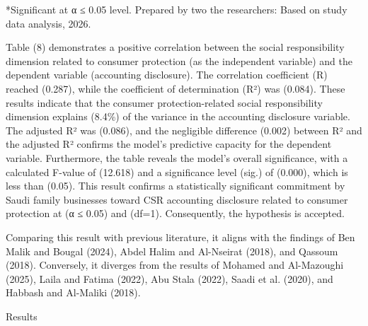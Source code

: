 \documentclass[10pt]{NSP1}
\begin{document}
*Significant at α ≤ 0.05 level. Prepared by two the researchers: Based on study data analysis, 2026.

Table (8) demonstrates a positive correlation between the social responsibility dimension related to consumer protection (as the independent variable) and the dependent variable (accounting disclosure). The correlation coefficient (R) reached (0.287), while the coefficient of determination (R²) was (0.084). These results indicate that the consumer protection-related social responsibility dimension explains (8.4\%) of the variance in the accounting disclosure variable. The adjusted R² was (0.086), and the negligible difference (0.002) between R² and the adjusted R² confirms the model’s predictive capacity for the dependent variable. Furthermore, the table reveals the model's overall significance, with a calculated F-value of (12.618) and a significance level (sig.) of (0.000), which is less than (0.05). This result confirms a statistically significant commitment by Saudi family businesses toward CSR accounting disclosure related to consumer protection at (α ≤ 0.05) and (df=1). Consequently, the hypothesis is accepted.

Comparing this result with previous literature, it aligns with the findings of Ben Malik and Bougal (2024), Abdel Halim and Al-Nseirat (2018), and Qassoum (2018). Conversely, it diverges from the results of Mohamed and Al-Mazoughi (2025), Laila and Fatima (2022), Abu Stala (2022), Saadi et al. (2020), and Habbash and Al-Maliki (2018).

Results
\end{document}
